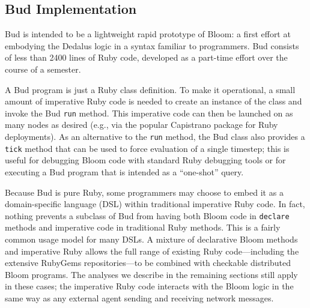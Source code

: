 \subsection{Bud Implementation}
Bud is intended to be a lightweight rapid prototype of Bloom: a first effort at
embodying the Dedalus logic in a syntax familiar to programmers.  Bud consists
of less than 2400 lines of Ruby code, developed as a part-time effort over the
course of a semester.



A Bud program is just a Ruby class definition.  To make it operational, a small
amount of imperative Ruby code is needed to create an instance of the class and
invoke the Bud \texttt{run} method.  This imperative code can then be launched
on as many nodes as desired (e.g., via the popular Capistrano package for Ruby
deployments). As an alternative to the \texttt{run} method, the Bud class also
provides a \texttt{tick} method that can be used to force evaluation of a single
timestep; this is useful for debugging Bloom code with standard Ruby debugging
tools or for executing a Bud program that is intended as a ``one-shot'' query.

Because Bud is pure Ruby, some programmers may choose to embed it as a
domain-specific language (DSL) within traditional imperative Ruby code.  In
fact, nothing prevents a subclass of Bud from having both Bloom code in
\texttt{declare} methods and imperative code in traditional Ruby methods.  This
is a fairly common usage model for many DSLs. A mixture of declarative Bloom
methods and imperative Ruby allows the full range of existing Ruby
code---including the extensive RubyGems repositories---to be combined with
checkable distributed Bloom programs. The analyses we describe in the remaining
sections still apply in these cases; the imperative Ruby code interacts with the
Bloom logic in the same way as any external agent sending and receiving network
messages.
